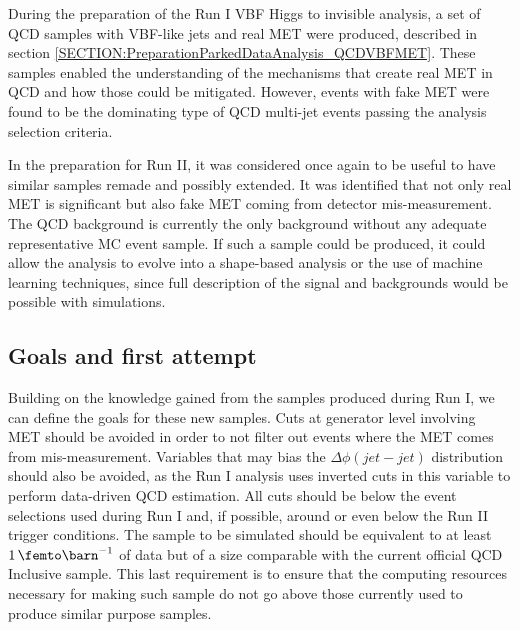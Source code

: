 
During the preparation of the Run I \gls{VBF} Higgs to invisible analysis, a set of \gls{QCD} samples with \gls{VBF}-like jets and real \gls{MET} were produced, described in section \ref{SECTION:PreparationParkedDataAnalysis_QCDVBFMET}. These samples enabled the understanding of the mechanisms that create real \gls{MET} in \gls{QCD} and how those could be mitigated. However, events with fake \gls{MET} were found to be the dominating type of QCD multi-jet events passing the analysis selection criteria. 

In the preparation for Run II, it was considered once again to be useful to have similar samples remade and possibly extended. It was identified that not only real \gls{MET} is significant but also fake \gls{MET} coming from detector mis-measurement. The \gls{QCD} background is currently the only background without any adequate representative \gls{MC} event sample. If such a sample could be produced, it could allow the analysis to evolve into a shape-based analysis or the use of machine learning techniques, since full description of the signal and backgrounds would be possible with simulations.

\subsection{Goals and first attempt}
\label{SUBSECTION:RunIIPreparation_GoalsAndFirstAttempt}


Building on the knowledge gained from the samples produced during Run I, we can define the goals for these new samples. Cuts at generator level involving \gls{MET} should be avoided in order to not filter out events where the \gls{MET} comes from mis-measurement. Variables that may bias the $\Delta\phi(jet-jet)$ distribution should also be avoided, as the Run I analysis uses inverted cuts in this variable to perform data-driven \gls{QCD} estimation. All cuts should be below the event selections used during Run I and, if possible, around or even below the Run II trigger conditions. The sample to be simulated should be equivalent to at least $1\,\femto\barn^{-1}$ of data but of a size comparable with the current official \gls{QCD} Inclusive sample. This last requirement is to ensure that the computing resources necessary for making such sample do not go above those currently used to produce similar purpose samples. 

